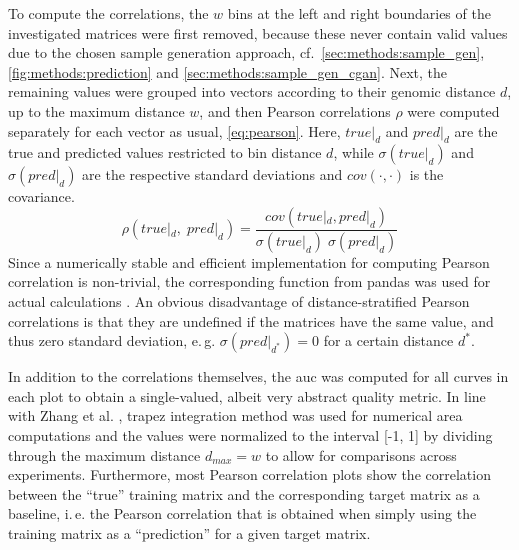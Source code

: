To compute the correlations, the $w$ bins at the left and right boundaries of the investigated matrices were first removed, because these never contain 
valid values due to the chosen sample generation approach, 
cf.~\cref{sec:methods:sample_gen}, \cref{fig:methods:prediction} and \cref{sec:methods:sample_gen_cgan}.
Next, the remaining values were grouped into vectors according to their genomic distance $d$, up to the maximum distance $w$, 
and then Pearson correlations $\rho$ were computed separately for each vector as usual, \cref{eq:pearson}.
Here, $\mathit{true}|_d$ and $\mathit{pred}|_d$ are the true and predicted values restricted to bin distance $d$, while
$\sigma(\mathit{true}|_d)$ and $\sigma(\mathit{pred}|_d)$ are the respective standard deviations and $cov(\cdot,\cdot)$ is the covariance.
\begin{equation}
 \rho(\mathit{true}|_d, \; \mathit{pred}|_d) = \frac{cov(\mathit{true}|_d, \mathit{pred}|_d)}{\sigma(\mathit{true}|_d)\; \sigma(\mathit{pred}|_d)} \label{eq:pearson}
\end{equation}
Since a numerically stable and efficient implementation for computing Pearson correlation is non-trivial, the corresponding function from pandas was used
for actual calculations \cite{pandasPearson}.
An obvious disadvantage of distance-stratified Pearson correlations is that they are undefined if the matrices have the same value, 
and thus zero standard deviation, e.\,g. $\sigma(\mathit{pred}|_{d^*})=0$ for a certain distance $d^*$.

In addition to the correlations themselves, the \acrfull{auc} was computed for all curves in each plot 
to obtain a single-valued, albeit very abstract quality metric.
In line with Zhang et al. \cite{Zhang2019}, trapez integration method was used for numerical area computations
and the values were normalized to the interval [-1, 1] by dividing through the maximum distance $d_\mathit{max} = w$ to allow for comparisons across experiments.
Furthermore, most Pearson correlation plots show the correlation between the ``true'' training matrix and the corresponding target matrix as a baseline,
i.\,e. the Pearson correlation that is obtained when simply using the training matrix as a ``prediction'' for a given target matrix.

